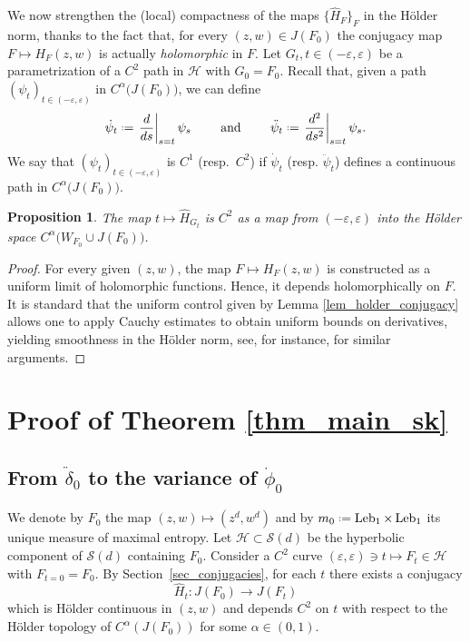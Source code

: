 \documentclass[11pt]{amsart}
\theoremstyle{plain}
\newtheorem{prop}[thm]{Proposition}
\theoremstyle{definition}
\theoremstyle{remark}
\newcommand*{\defeq}{\mathrel{\vcenter{\baselineskip0.5ex \lineskiplimit0pt
			\hbox{\scriptsize.}\hbox{\scriptsize.}}}%
	=}
\DeclareMathOperator{\Leb}{Leb}
\begin{document}
We now strengthen
 the 
(local) 
compactness
of the maps $\{\hat H_F\}_{F}$ in the H\"older norm, thanks to the fact that,
for every $(z,w)\in J(F_0)$
 the conjugacy
map $F\mapsto H_F (z,w)$
is actually \emph{holomorphic} in $F$.
Let $G_t, t\in (-\varepsilon,\varepsilon)$ be a parametrization of a $C^2$
path in
$\mathcal H$
 with
$G_0=F_0$.
Recall that, given a path
$(\psi_t)_{ t\in(-\varepsilon,\varepsilon)}$ 
in $C^\alpha\bigl(J(F_0)\bigr)$,
we can define 
\begin{equation}\label{eq:def-dot-ddot-phi}
\dot\psi_t\defeq\left.\frac{d}{ds}\right|_{s=t}\psi_s
\qquad
\mbox{ and }
\qquad
\ddot\psi_t\defeq\left.\frac{d^2}{ds^2}\right|_{s=t}\psi_s.
\end{equation}
We say that
$(\psi_t)_{ t\in(-\varepsilon,\varepsilon)}$ is $C^1$
 (resp.\ $C^2$) if $\dot\psi_t$ (resp. $\ddot\psi_t$)
 defines a continuous path in 
 $C^\alpha\bigl(J(F_0)\bigr)$.

\begin{prop}
\label{prop_param_regularity}
The map
$t\mapsto \hat H_{G_t}$
is $C^2$ 
as a map from $(-\varepsilon,\varepsilon)$ into the H\"older space
$C^\alpha\bigl(W_{F_0} \cup J(F_0)\bigr)$.
\end{prop}



\begin{proof}
For every given $(z,w)$,
the map
$F\mapsto H_F(z,w)$ is
 constructed as a uniform limit
of holomorphic functions.
 Hence, it
depends holomorphically on  $F$.
It is 
standard
that the uniform
 control 
given by Lemma \ref{lem_holder_conjugacy} 
allows one to apply Cauchy estimates to obtain
uniform bounds on derivatives, yielding smoothness
 in the H\"older norm, see, for instance, \cite{SU10}
 for similar arguments.
\end{proof}



\section{Proof of Theorem \ref{thm_main_sk}}
\label{s:proof-thm}




\subsection{From $\ddot \delta_0$ to the variance of $\dot \phi_0$}\label{sec_derivative}

We denote by
 $F_0$ the map 
$(z,w)\mapsto (z^d,w^d)$
and by $m_0 \defeq \Leb_{1}\times \Leb_{1}$ its unique measure of maximal entropy.
 Let $\mathcal H\subset\mathcal S(d)$ be the
 hyperbolic component of $\mathcal S(d)$ containing $F_0$.
Consider a $C^2$ curve $(\varepsilon, \varepsilon)\ni t\mapsto F_t\in\mathcal H$ with $F_{t=0}=F_0$.
By Section~\ref{sec_conjugacies}, for each $t$
 there exists a conjugacy
\[
\hat H_t\colon J(F_0)\longrightarrow J(F_t)
\]
which is H\"older continuous in $(z,w)$
 and depends $C^2$ on $t$ with respect to the 
  H\"older topology of $C^\alpha(J(F_0))$ for some $\alpha\in (0,1)$.
\end{document}

